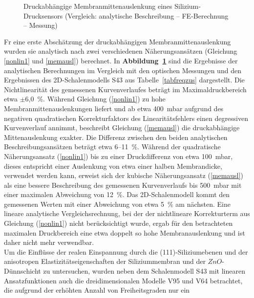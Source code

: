 \begin{figure}[htb]
\begin{center}

\setabbva
\end{center}
\caption{\label{abbmemauslvgl}
 Druckabhängige Membranmittenauslenkung eines Silizium-Drucksensors
 (Vergleich: analytische Beschreibung -- FE-Berechnung -- Messung)}
\end{figure}
Fr eine erste Abschätzung der druckabhängigen Membranmittenauslenkung
wurden sie analytisch nach zwei verschiedenen Näherungsansätzen
(Gleichung \ref{nonlin1} und
\ref{memausl}) berechnet. In {\bf Abbildung~\ref{abbmemauslvgl}} sind die
Ergebnisse der analytischen Berechnungen im Vergleich mit den optischen
Messungen und den Ergebnissen des 2D-Schalenmodells S43 aus
Tabelle~\ref{tabfreqzus} dargestellt. Die Nichtlinearität des gemessenen
Kurvenverlaufes beträgt im Maximaldruckbereich etwa $\pm$6,0~\%.
Während Gleichung (\ref{nonlin1}) zu hohe
Membranmittenauslenkungen liefert und ab etwa 400~mbar aufgrund des
negativen quadratischen Korrekturfaktors des Linearitätsfehlers
einen degressiven Kurvenverlauf annimmt, beschreibt Gleichung
(\ref{memausl}) die druckabhängige Mittenauslenkung exakter.
Die Differenz zwischen den beiden analytischen Beschreibungsansätzen
beträgt etwa  6--11~\%. Während der quadratische Näherungsansatz
(\ref{nonlin1}) bis zu einer Druckdifferenz von etwa 100~mbar, dieses
entspricht einer Auslenkung von etwa einer halben Membrandicke, verwendet
werden kann, erweist sich der kubische Näherungsansatz (\ref{memausl})
als eine bessere Beschreibung des gemessenen Kurvenverlaufs bis 500~mbar
mit einer maximalen Abweichung von 12~\%.
Das 2D-Schalenmodell kommt den gemessenen Werten mit einer Abweichung
von etwa 5~\% am nächsten. Eine lineare analytische Vergleichsrechnung,
bei der der nichtlineare Korrekturterm aus Gleichung (\ref{nonlin1})
nicht berücksichtigt wurde, ergab für den betrachteten maximalen
Druckbereich eine etwa doppelt so hohe Membranauslenkung und ist daher
nicht mehr verwendbar.\\
%
Um die Einflüsse der realen Einspannung durch die (111)-Siliziumebenen
und der anisotropen Elastizitätseigenschaften der Siliziummembran und
der $ZnO$-Dünnschicht zu untersuchen, wurden neben dem Schalenmodell S43 mit
linearen Ansatzfunktionen auch die dreidimensionalen Modelle V95 und V64
betrachtet, die aufgrund der erhöhten Anzahl von Freiheitsgraden nur ein
